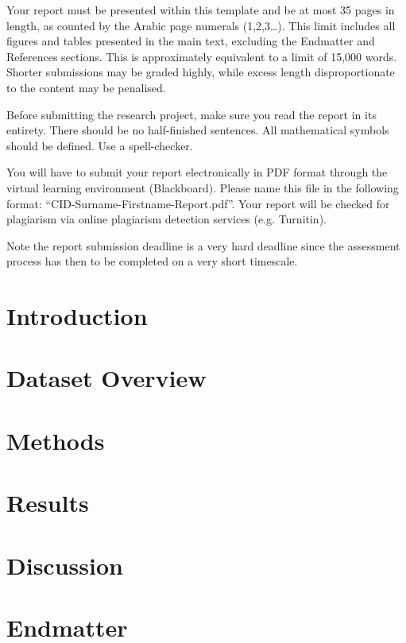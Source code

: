\documentclass{statsmsc}
\begin{document}
Your report must be presented within this template and be at most 35 pages in length, as counted by the Arabic page numerals (1,2,3…). This limit includes all figures and tables presented in the main text, excluding the Endmatter and References sections. This is approximately equivalent to a limit of 15,000 words. Shorter submissions may be graded highly, while excess length disproportionate to the content may be penalised.


Before submitting the research project, make sure you read the report in its entirety. There should be no half-finished sentences. All mathematical symbols should be defined. Use a spell-checker.

You will have to submit your report electronically in PDF format through the virtual learning environment (Blackboard). Please name this file in the following format: “CID-Surname-Firstname-Report.pdf”. Your report will be checked for plagiarism via online plagiarism detection services (e.g. Turnitin). 

Note the report submission deadline is a very hard deadline since the assessment process has then to be completed on a very short timescale.
\section{Introduction}

\section{Dataset Overview}

\section{Methods}\label{sec:methods}

\section{Results}


\section{Discussion}



\section{Endmatter} \label{sec:endmatter}

\end{document}
